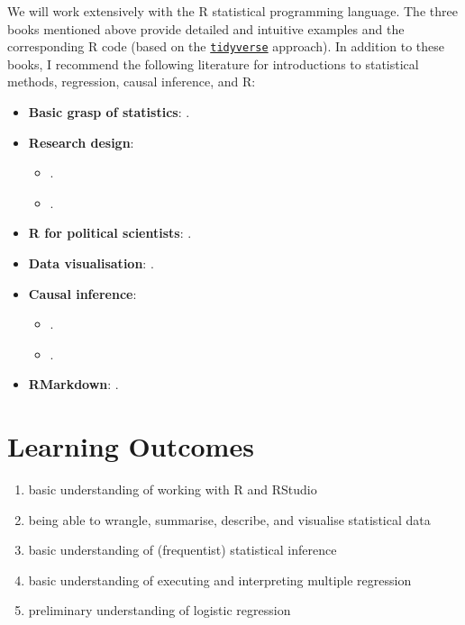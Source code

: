 \documentclass[abstract=on,parskip=full,headings=standardclasses,fontsize=11pt,paper=a4]{scrartcl}
\begin{document}
We will work extensively with the \textsf{R} statistical programming language. The three books mentioned above \autocite{ismay20,wickham17,healy19}   provide detailed and intuitive examples and the corresponding \textsf{R} code (based on the \href{https://www.tidyverse.org}{\texttt{tidyverse}} approach). In addition to these books, I recommend the following literature for introductions to statistical methods, regression, causal inference, and \textsf{R}:

\begin{itemize}
\item \textbf{Basic grasp of statistics}: .
\item \textbf{Research design}: 
\begin{itemize}
\item {}.
\item {}.
\end{itemize}
\item \textbf{\textsf{R} for political scientists}: .
\item \textbf{Data visualisation}: .
\item \textbf{Causal inference}: 
\begin{itemize}
\item {}.
\item {}.
\end{itemize}
\item \textbf{RMarkdown}: .
\end{itemize}

\section*{Learning Outcomes}

\begin{enumerate}
\item basic understanding of working with \textsf{R} and RStudio
\item being able to wrangle, summarise, describe, and visualise statistical data
\item  basic understanding of (frequentist) statistical inference
\item  basic understanding of executing and interpreting multiple regression
\item  preliminary understanding of logistic regression
\end{enumerate}
\end{document}
